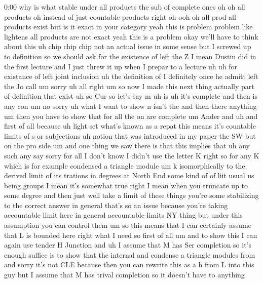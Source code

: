 \begin{unfinished}{0:00}
why  is  what  stable  under  all  products
the  sub  of  complete  ones  oh  oh  all
products  oh  instead  of  just  countable
products  right
oh
ooh  oh  all  prod  all  products  exist  but
is  it  exact  in  your  category  yeah  this
is  problem  problem  like  lightens  all
products  are  not
exact  yeah  this  is  a
problem  okay  we'll  have  to  think  about
this  uh  chip  chip
chip  not  an  actual  issue  in  some  sense
but  I  screwed  up  to  definition  so  we
should
ask  for  the  existence  of  left  the
Z  I  mean  Dustin  did  in  the  first  lecture
and  I  just  threw  it  up  when  I  prepar  to
a  lecture
uh  uh  for  existance  of  left
joint
inclusion  uh  the  definition
of
I  definitely  once  he  admitt  left  the
Jo
call
um
sorry
uh  all
right  um  so  now  I  made  this  next  thing
actually  part  of  definition  that  exist
uh  so
Cur  so  let's  say
m  uh  is  uh  it's  complete  and
then  is  any
con  um  no  sorry  uh  what  I  want  to  show
n  isn't
the  and  then  there  anything
um  then  you  have  to
show  that  for  all  the  on  are
complete
um
Ander
and
uh
and  first  of  all
because  uh  light
set  what's  known  as  a
repat  this  means  it's
countable  limits  of  s  or
subjections
uh  notion  that  was  introduced  in  my
paper  the  SW  but  on  the  pro  side  um  and
one  thing  we  saw  there  is  that  this
implies  that  uh  any
such  any  say  sorry  for  all  I  don't  know
I  didn't  use  the  letter  K  right  so  for
any  K  which  is  for  example  condensed  a
triangle  module  um  k  isomorphically  to
the  derived
limit  of  its  trations  in  degrees  at
North
End  some  kind  of  of
liit  usual  us  being  groups  I  mean  it's
somewhat  true  right  I  mean  when  you
truncate  up  to  some  degree  and  then  just
well  take  a  limit  of  these  things  you're
some  stabilizing  to  the  correct  answer
in  general  that's  so  an  issue  because
you're  taking
accountable  limit  here  in  general
accountable  limits  NY  thing  but  under
this  assumption  you  can  control
them
um  so  this  means  that  I  can  certainly
assume  that  L  is  bounded
here
right  what  I
need
so  first  of  all
um  and  to  show  this  I  can  again  use
tender  H  Junction  and  uh  I  assume  that  M
has  Ser  completion  so  it's  enough
suffice  is  to  show  that  the
internal  and  condense  a  triangle  modules
from
and  sorry  it's  not
CLE  because  then  you  can  rewrite  this  as
a  h  from  L  into  this  guy  but  I  assume
that  M  has  trival  completion  so  it
doesn't  have  to  anything

\end{unfinished}
